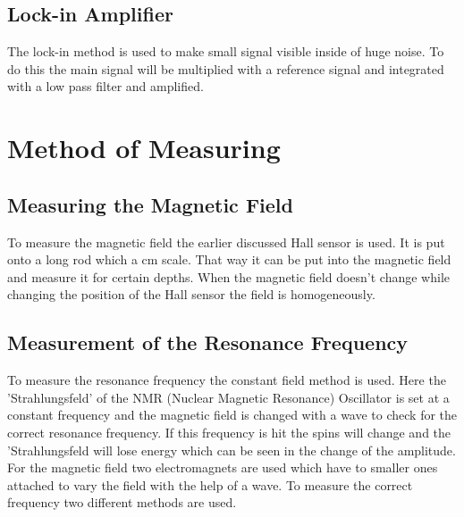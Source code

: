 \subsection{Lock-in Amplifier}
The lock-in method is used to make small signal visible inside of huge noise. To do this the main signal will be multiplied with a reference signal and integrated with a low pass filter and amplified.
\section{Method of Measuring}
\subsection{Measuring the Magnetic Field}
To measure the magnetic field the earlier discussed Hall sensor is used. It is put onto a long rod which a cm scale. That way it can be put into the magnetic field and measure it for certain depths.  When the magnetic field doesn't change while changing the position of the Hall sensor the field is homogeneously. 
\subsection{Measurement of the Resonance Frequency}
To measure the resonance frequency the constant field method is used. Here the 'Strahlungsfeld' of the NMR (Nuclear Magnetic Resonance) Oscillator is set at a constant frequency and the magnetic field is changed with a wave to check for the correct resonance frequency. If this frequency is hit the spins will change and the 'Strahlungsfeld will lose energy which can be seen in the change of the amplitude. For the magnetic field two electromagnets are used which have to smaller ones attached to vary the field with the help of a wave. To measure the correct frequency two different methods are used.
